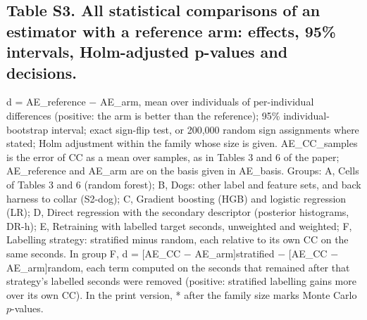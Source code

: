 \documentclass[10pt,a4paper]{article}
\begin{document}
\subsection*{Table S3. All statistical comparisons of an estimator with a reference arm: effects, 95\% intervals, Holm-adjusted p-values and decisions.}
{\footnotesize d = AE\_reference $-$ AE\_arm, mean over individuals of per-individual differences (positive: the arm is better than the reference); 95\% individual-bootstrap interval; exact sign-flip test, or 200,000 random sign assignments where stated; Holm adjustment within the family whose size is given. AE\_CC\_samples is the error of CC as a mean over samples, as in Tables 3 and 6 of the paper; AE\_reference and AE\_arm are on the basis given in AE\_basis. Groups: A, Cells of Tables 3 and 6 (random forest); B, Dogs: other label and feature sets, and back harness to collar (S2-dog); C, Gradient boosting (HGB) and logistic regression (LR); D, Direct regression with the secondary descriptor (posterior histograms, DR-h); E, Retraining with labelled target seconds, unweighted and weighted; F, Labelling strategy: stratified minus random, each relative to its own CC on the same seconds. In group F, d = [AE\_CC $-$ AE\_arm]stratified $-$ [AE\_CC $-$ AE\_arm]random, each term computed on the seconds that remained after that strategy's labelled seconds were removed (positive: stratified labelling gains more over its own CC). In the print version, * after the family size marks Monte Carlo $p$-values.\par}\smallskip
\end{document}
